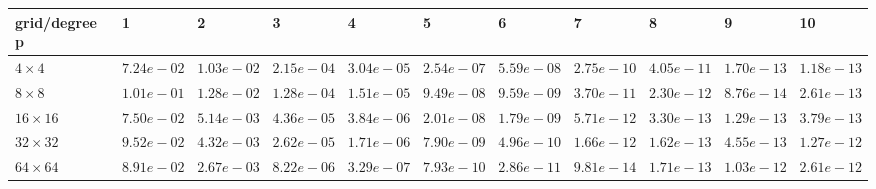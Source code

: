 \begin{tabular}{lllllllllll}
\hline
 grid/degree p   & 1          & 2          & 3          & 4          & 5          & 6          & 7          & 8          & 9          & 10         \\
\hline
 $4 \times 4$    & $7.24e-02$ & $1.03e-02$ & $2.15e-04$ & $3.04e-05$ & $2.54e-07$ & $5.59e-08$ & $2.75e-10$ & $4.05e-11$ & $1.70e-13$ & $1.18e-13$ \\
 $8 \times 8$    & $1.01e-01$ & $1.28e-02$ & $1.28e-04$ & $1.51e-05$ & $9.49e-08$ & $9.59e-09$ & $3.70e-11$ & $2.30e-12$ & $8.76e-14$ & $2.61e-13$ \\
 $16 \times 16$  & $7.50e-02$ & $5.14e-03$ & $4.36e-05$ & $3.84e-06$ & $2.01e-08$ & $1.79e-09$ & $5.71e-12$ & $3.30e-13$ & $1.29e-13$ & $3.79e-13$ \\
 $32 \times 32$  & $9.52e-02$ & $4.32e-03$ & $2.62e-05$ & $1.71e-06$ & $7.90e-09$ & $4.96e-10$ & $1.66e-12$ & $1.62e-13$ & $4.55e-13$ & $1.27e-12$ \\
 $64 \times 64$  & $8.91e-02$ & $2.67e-03$ & $8.22e-06$ & $3.29e-07$ & $7.93e-10$ & $2.86e-11$ & $9.81e-14$ & $1.71e-13$ & $1.03e-12$ & $2.61e-12$ \\
\hline
\end{tabular}